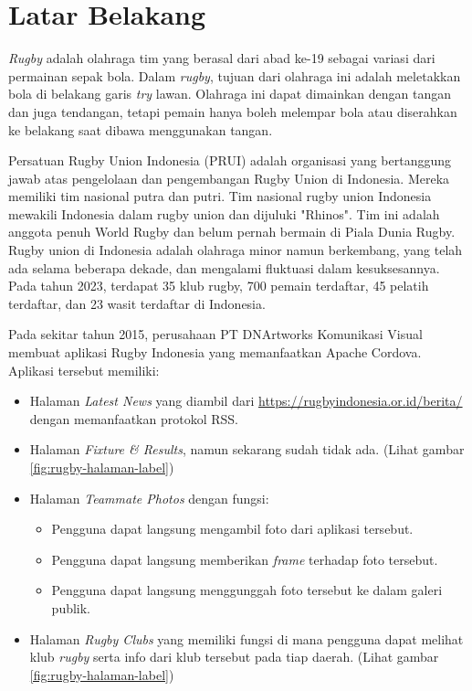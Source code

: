 \documentclass[a4paper,twoside]{article}
\begin{document}
\section{Latar Belakang}
\textit{Rugby} adalah olahraga tim yang berasal dari abad ke-19 sebagai variasi dari permainan sepak bola. Dalam \textit{rugby}, tujuan dari olahraga ini adalah meletakkan bola di belakang garis \textit{try} lawan. Olahraga ini dapat dimainkan dengan tangan dan juga tendangan, tetapi pemain hanya boleh melempar bola atau diserahkan ke belakang saat dibawa menggunakan tangan.

Persatuan Rugby Union Indonesia (PRUI) adalah organisasi yang bertanggung jawab atas pengelolaan dan pengembangan Rugby Union di Indonesia. Mereka memiliki tim nasional putra dan putri. Tim nasional rugby union Indonesia mewakili Indonesia dalam rugby union dan dijuluki "Rhinos". Tim ini adalah anggota penuh World Rugby dan belum pernah bermain di Piala Dunia Rugby. Rugby union di Indonesia adalah olahraga minor namun berkembang, yang telah ada selama beberapa dekade, dan mengalami fluktuasi dalam kesuksesannya. Pada tahun 2023, terdapat 35 klub rugby, 700 pemain terdaftar, 45 pelatih terdaftar, dan 23 wasit terdaftar di Indonesia.

Pada sekitar tahun 2015, perusahaan PT DNArtworks Komunikasi Visual membuat aplikasi Rugby Indonesia yang memanfaatkan Apache Cordova. Aplikasi tersebut memiliki: 
\begin{itemize}
    \item Halaman \textit{Latest News} yang diambil dari \url{https://rugbyindonesia.or.id/berita/} dengan memanfaatkan protokol RSS.
    \item Halaman \textit{Fixture \& Results}, namun sekarang sudah tidak ada. {(Lihat gambar \ref{fig:rugby-halaman-label})}
    \item Halaman \textit{Teammate Photos} dengan fungsi:
    \begin{itemize}
        \item Pengguna dapat langsung mengambil foto dari aplikasi tersebut.
        \item Pengguna dapat langsung memberikan \textit{frame} terhadap foto tersebut.
        \item Pengguna dapat langsung menggunggah foto tersebut ke dalam galeri publik.
    \end{itemize}
    \item Halaman \textit{Rugby Clubs} yang memiliki fungsi di mana pengguna dapat melihat klub \textit{rugby} serta info dari klub tersebut pada tiap daerah. {(Lihat gambar \ref{fig:rugby-halaman-label})}
\end{itemize}
\end{document}
